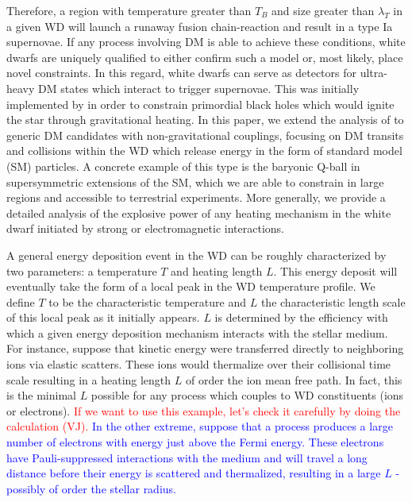 \documentclass[twocolumn,showpacs,preprintnumbers,amsmath,amssymb,prd]{revtex4}
\begin{document}
Therefore, a region with temperature greater than $T_B$ and size greater than $\lambda_T$ in a given WD will launch a runaway fusion chain-reaction and result in a type Ia supernovae. If any process involving DM is able to achieve these conditions, white dwarfs are uniquely qualified to either confirm such a model or, most likely, place novel constraints. In this regard, white dwarfs can serve as detectors for ultra-heavy DM states which interact to trigger supernovae. This was initially implemented by \cite{Graham:2015apa} in order to constrain primordial black holes which would ignite the star through gravitational heating. In this paper, we extend the analysis of \cite{Graham:2015apa} to generic DM candidates with non-gravitational couplings, focusing on DM transits and collisions within the WD which release energy in the form of standard model (SM) particles. A concrete example of this type is the baryonic Q-ball in supersymmetric extensions of the SM, which we are able to constrain in large regions and accessible to terrestrial experiments. More generally, we provide a detailed analysis of the explosive power of any heating mechanism in the white dwarf initiated by strong or electromagnetic interactions.

A general energy deposition event in the WD can be roughly characterized by two parameters: a temperature $T$ and heating length $L$. This energy deposit will eventually take the form of a local peak in the WD temperature profile. We define $T$ to be the characteristic temperature and $L$ the characteristic length scale of this local peak as it initially appears. $L$ is determined by the efficiency with which a given energy deposition mechanism interacts with the stellar medium. For instance, suppose that kinetic energy were transferred directly to neighboring ions via elastic scatters. These ions would thermalize over their collisional time scale resulting in a heating length $L$ of order the ion mean free path. In fact, this is the minimal $L$ possible for any process which couples to WD constituents (ions or electrons). \textcolor{red}{If we want to use this example, let's check it carefully by doing the calculation (VJ).} \textcolor{blue}{In the other extreme, suppose that a process produces a large number of electrons with energy just above the Fermi energy.  These electrons have Pauli-suppressed interactions with the medium and will travel a long distance before their energy is scattered and thermalized, resulting in a large $L$ - possibly of order the stellar radius.}
\end{document}
